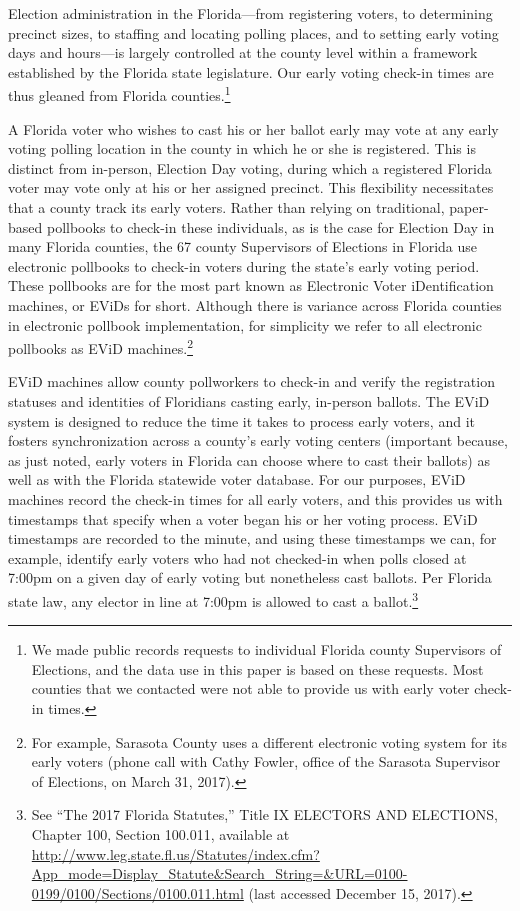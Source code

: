 \documentclass[12pt,titlepage]{article}
\begin{document}
Election administration in the Florida---from registering voters, to
determining precinct sizes, to staffing and locating polling places,
and to setting early voting days and hours---is largely controlled at
the county level within a framework established by the Florida state
legislature. Our early voting check-in times are thus gleaned from
Florida counties.\footnote{We made public records requests to
  individual Florida county Supervisors of Elections, and the data use
  in this paper is based on these requests.  Most counties that we
  contacted were not able to provide us with early voter check-in
  times.}


A Florida voter who wishes to cast his or her ballot early may vote at
any early voting polling location in the county in which he or she is
registered.  This is distinct from in-person, Election Day voting,
during which a registered Florida voter may vote only at his or her
assigned precinct.  This flexibility necessitates that a county track
its early voters.  Rather than relying on traditional, paper-based
pollbooks to check-in these individuals, as is the case for Election
Day in many Florida counties, the 67 county Supervisors of Elections
in Florida use electronic pollbooks to check-in voters during the
state's early voting period.  These pollbooks are for the most part
known as Electronic Voter iDentification machines, or EViDs for short.
Although there is variance across Florida counties in electronic
pollbook implementation, for simplicity we refer to all electronic
pollbooks as EViD machines.\footnote{For example, Sarasota County uses
  a different electronic voting system for its early voters (phone
  call with Cathy Fowler, office of the Sarasota Supervisor of
  Elections, on March 31, 2017).}


EViD machines allow county pollworkers to check-in and verify the
registration statuses and identities of Floridians casting early,
in-person ballots. The EViD system is designed to reduce the time it
takes to process early voters, and it fosters synchronization across a
county's early voting centers (important because, as just noted, early
voters in Florida can choose where to cast their ballots) as well as
with the Florida statewide voter database.  For our purposes, EViD
machines record the check-in times for all early voters, and this
provides us with timestamps that specify when a voter began his or her
voting process. EViD timestamps are recorded to the minute, and using
these timestamps we can, for example, identify early voters who had
not checked-in when polls closed at 7:00pm on a given day of early
voting but nonetheless cast ballots.  Per Florida state law, any
elector in line at 7:00pm is allowed to cast a ballot.\footnote{See
  ``The 2017 Florida Statutes,'' Title IX ELECTORS AND ELECTIONS,
  Chapter 100, Section 100.011, available at
  \url{http://www.leg.state.fl.us/Statutes/index.cfm?App\_mode=Display\_Statute\&Search\_String=\&URL=0100-0199/0100/Sections/0100.011.html}
  (last accessed December 15, 2017).}
\end{document}
